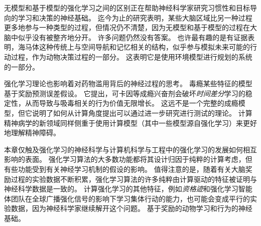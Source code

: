 无模型和基于模型的强化学习之间的区别正在帮助神经科学家研究习惯性和目标导向的学习和决策的神经基础。
迄今为止的研究表明，某些大脑区域比另一种过程更多地参与一种类型的过程，但情况仍不清楚，因为无模型和基于模型的过程在大脑中似乎没有被整齐地分开。
许多问题仍然没有答案。
也许最有趣的是有证据表明，海马体这种传统上与空间导航和记忆相关的结构，似乎参与模拟未来可能的行动过程，作为动物决策过程的一部分。
这表明它是使用环境模型进行规划的系统的一部分。


强化学习理论也影响着对药物滥用背后的神经过程的思考。
毒瘾某些特征的模型基于奖励预测误差假设。
它提出，可卡因等成瘾兴奋剂会破坏\textit{时间差分}学习的稳定性，从而导致与吸毒相关的行为价值无限增长。
这远不是一个完整的成瘾模型，但它说明了如何从计算角度提出可以通过进一步研究进行测试的理论。
计算精神病学的新领域同样侧重于使用计算模型（其中一些模型源自强化学习）来更好地理解精神障碍。



本章仅触及强化学习的神经科学与计算机科学与工程中的强化学习的发展如何相互影响的表面。
强化学习算法的大多数功能都将其设计归因于纯粹的计算考虑，但有些功能受到有关神经学习机制的假设的影响。
值得注意的是，随着有关大脑奖励过程的实验数据不断积累，强化学习算法的许多纯粹由计算驱动的特征被证明与神经科学数据是一致的。
计算强化学习的其他特征，例如\textit{资格迹}和强化学习智能体团队在全球广播强化信号的影响下学习集体行动的能力，也可能会变成平行的实验数据，因为神经科学家继续解开这个问题。
基于奖励的动物学习和行为的神经基础。








